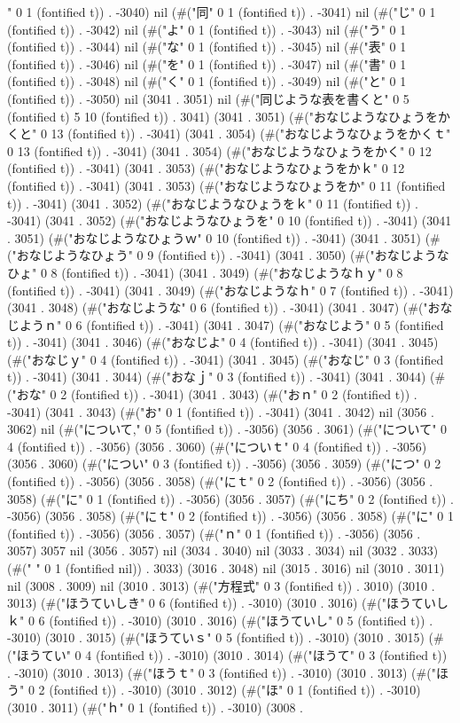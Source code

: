 " 0 1 (fontified t)) . -3040) nil (#("同" 0 1 (fontified t)) . -3041) nil (#("じ" 0 1 (fontified t)) . -3042) nil (#("よ" 0 1 (fontified t)) . -3043) nil (#("う" 0 1 (fontified t)) . -3044) nil (#("な" 0 1 (fontified t)) . -3045) nil (#("表" 0 1 (fontified t)) . -3046) nil (#("を" 0 1 (fontified t)) . -3047) nil (#("書" 0 1 (fontified t)) . -3048) nil (#("く" 0 1 (fontified t)) . -3049) nil (#("と" 0 1 (fontified t)) . -3050) nil (3041 . 3051) nil (#("同じような表を書くと" 0 5 (fontified t) 5 10 (fontified t)) . 3041) (3041 . 3051) (#("おなじようなひょうをかくと" 0 13 (fontified t)) . -3041) (3041 . 3054) (#("おなじようなひょうをかくｔ" 0 13 (fontified t)) . -3041) (3041 . 3054) (#("おなじようなひょうをかく" 0 12 (fontified t)) . -3041) (3041 . 3053) (#("おなじようなひょうをかｋ" 0 12 (fontified t)) . -3041) (3041 . 3053) (#("おなじようなひょうをか" 0 11 (fontified t)) . -3041) (3041 . 3052) (#("おなじようなひょうをｋ" 0 11 (fontified t)) . -3041) (3041 . 3052) (#("おなじようなひょうを" 0 10 (fontified t)) . -3041) (3041 . 3051) (#("おなじようなひょうｗ" 0 10 (fontified t)) . -3041) (3041 . 3051) (#("おなじようなひょう" 0 9 (fontified t)) . -3041) (3041 . 3050) (#("おなじようなひょ" 0 8 (fontified t)) . -3041) (3041 . 3049) (#("おなじようなｈｙ" 0 8 (fontified t)) . -3041) (3041 . 3049) (#("おなじようなｈ" 0 7 (fontified t)) . -3041) (3041 . 3048) (#("おなじような" 0 6 (fontified t)) . -3041) (3041 . 3047) (#("おなじようｎ" 0 6 (fontified t)) . -3041) (3041 . 3047) (#("おなじよう" 0 5 (fontified t)) . -3041) (3041 . 3046) (#("おなじよ" 0 4 (fontified t)) . -3041) (3041 . 3045) (#("おなじｙ" 0 4 (fontified t)) . -3041) (3041 . 3045) (#("おなじ" 0 3 (fontified t)) . -3041) (3041 . 3044) (#("おなｊ" 0 3 (fontified t)) . -3041) (3041 . 3044) (#("おな" 0 2 (fontified t)) . -3041) (3041 . 3043) (#("おｎ" 0 2 (fontified t)) . -3041) (3041 . 3043) (#("お" 0 1 (fontified t)) . -3041) (3041 . 3042) nil (3056 . 3062) nil (#("について," 0 5 (fontified t)) . -3056) (3056 . 3061) (#("について" 0 4 (fontified t)) . -3056) (3056 . 3060) (#("についｔ" 0 4 (fontified t)) . -3056) (3056 . 3060) (#("につい" 0 3 (fontified t)) . -3056) (3056 . 3059) (#("につ" 0 2 (fontified t)) . -3056) (3056 . 3058) (#("にｔ" 0 2 (fontified t)) . -3056) (3056 . 3058) (#("に" 0 1 (fontified t)) . -3056) (3056 . 3057) (#("にち" 0 2 (fontified t)) . -3056) (3056 . 3058) (#("にｔ" 0 2 (fontified t)) . -3056) (3056 . 3058) (#("に" 0 1 (fontified t)) . -3056) (3056 . 3057) (#("ｎ" 0 1 (fontified t)) . -3056) (3056 . 3057) 3057 nil (3056 . 3057) nil (3034 . 3040) nil (3033 . 3034) nil (3032 . 3033) (#(" " 0 1 (fontified nil)) . 3033) (3016 . 3048) nil (3015 . 3016) nil (3010 . 3011) nil (3008 . 3009) nil (3010 . 3013) (#("方程式" 0 3 (fontified t)) . 3010) (3010 . 3013) (#("ほうていしき" 0 6 (fontified t)) . -3010) (3010 . 3016) (#("ほうていしｋ" 0 6 (fontified t)) . -3010) (3010 . 3016) (#("ほうていし" 0 5 (fontified t)) . -3010) (3010 . 3015) (#("ほうていｓ" 0 5 (fontified t)) . -3010) (3010 . 3015) (#("ほうてい" 0 4 (fontified t)) . -3010) (3010 . 3014) (#("ほうて" 0 3 (fontified t)) . -3010) (3010 . 3013) (#("ほうｔ" 0 3 (fontified t)) . -3010) (3010 . 3013) (#("ほう" 0 2 (fontified t)) . -3010) (3010 . 3012) (#("ほ" 0 1 (fontified t)) . -3010) (3010 . 3011) (#("ｈ" 0 1 (fontified t)) . -3010) (3008 . 